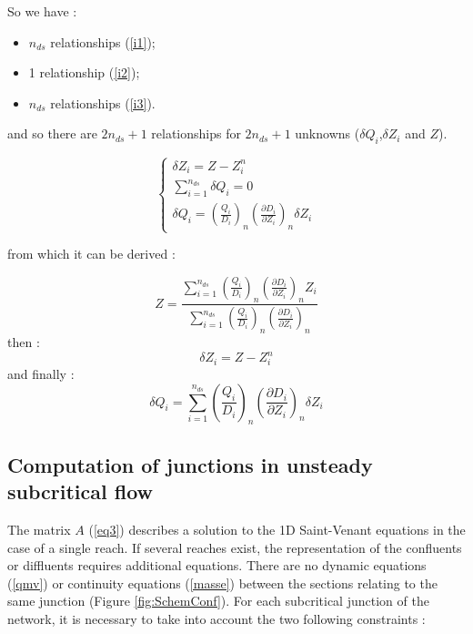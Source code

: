 So we have :
\begin{itemize}
 \item $n_{ds}$ relationships (\ref{i1});
 \item 1 relationship (\ref{i2});
 \item $n_{ds}$ relationships (\ref{i3}).
\end{itemize}
and so there are $2n_{ds}+1$ relationships for $2n_{ds}+1$ unknowns ($\delta Q_i$,$\delta Z_i$ and $Z$).

\begin{equation}
 \left \lbrace
  \begin{array}{l}
    \delta Z_i = Z - Z_{i}^n \\
    \sum_{i=1}^{n_{ds}} \delta Q_i = 0 \\
    \delta Q_i = \left ( \frac{Q_i}{D_i} \right )_n \left ( \frac{\partial D_i}{\partial Z_i} \right )_n \delta Z_i
  \end{array}
 \right.
\end{equation}

from which it can be derived :

\begin{equation}
  Z = \frac{\displaystyle \sum_{i=1}^{n_{ds}} \left ( \frac{Q_i}{D_i} \right )_n \left ( \frac{\partial D_i}{\partial Z_i} \right )_n Z_i}{\displaystyle \sum_{i=1}^{n_{ds}} \left ( \frac{Q_i}{D_i} \right )_n \left ( \frac{\partial D_i}{\partial Z_i} \right )_n}
\end{equation}
then :
\begin{equation}
  \delta Z_i = Z - Z_{i}^n
\end{equation}
and finally :
\begin{equation}
  \delta Q_i = \sum_{i=1}^{n_{ds}} \left ( \frac{Q_i}{D_i} \right )_n \left ( \frac{\partial D_i}{\partial Z_i} \right )_n \delta Z_i
\end{equation}


\subsection{Computation of junctions in unsteady subcritical flow} \label{NDRezo}

The matrix $A$ (\ref{eq3}) describes a solution to the 1D Saint-Venant equations in the case of a single reach. If several reaches exist, the representation of the confluents or diffluents requires additional equations. There are no dynamic equations (\ref{qmv}) or continuity equations (\ref{masse}) between the sections relating to the same junction (Figure \ref{fig:SchemConf}). For each subcritical junction of the network, it is necessary to take into account the two following constraints :

